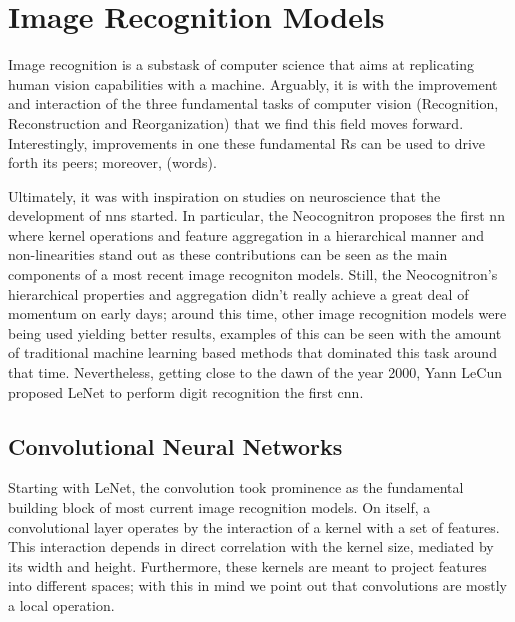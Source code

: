 \section{Image Recognition Models}
\label{rel:sec_imrecon}
Image recognition is a substask of computer science that aims at replicating human vision capabilities 
with a machine. Arguably, it is with the improvement and interaction of the three fundamental tasks 
of computer vision (Recognition, Reconstruction and Reorganization) \autocite{malik2016three} that we 
find this field moves forward. Interestingly, improvements in one these fundamental Rs can be 
used to drive forth its peers; moreover, (words).





Ultimately, it was with inspiration on studies on neuroscience \autocite{hubel1959receptive} that the 
development of \glspl{nn} started. In particular, the Neocognitron \autocite{fukushima1975cognitron} 
proposes the first \gls{nn} where kernel operations and feature aggregation in a hierarchical 
manner and non-linearities stand out as these contributions can be seen as the main components of a 
most recent image recogniton models.
Still, the Neocognitron's hierarchical properties and aggregation didn't really achieve 
a great deal of momentum on early days; around this time, other image recognition models were being 
used yielding better results, examples of this can be seen with the amount of traditional machine 
learning based methods that dominated this task around that time. Nevertheless, getting close to the 
dawn of the year 2000, Yann LeCun proposed LeNet to perform digit recognition 
\autocite{lecun1998gradient} the first \gls{cnn}.\\

\subsection{Convolutional Neural Networks}
\label{rel:sub_cnn}
Starting with LeNet, the convolution took prominence as the fundamental building block 
of most current image recognition models. On itself, a convolutional layer operates by the 
interaction of a kernel with a set of features. This interaction depends in 
direct correlation with the kernel size, mediated by its width and height. Furthermore, 
these kernels are meant to project features into different spaces; with this in mind we point out 
that convolutions are mostly a local operation. 
%

